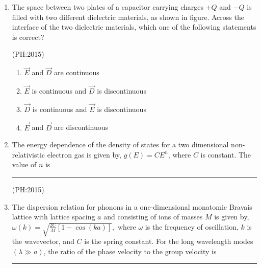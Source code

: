 \documentclass[journal,12pt,onecolumn]{IEEEtran}
\theoremstyle{remark}
\begin{document}
\begin{enumerate}
			\hfill{(PH:2015)}
		\begin{multicols}{4}
			\begin{enumerate}
				\item $n\approx p$
				\item $n > p$
				\item $\mu_e > \mu_h$
				\item ${m_e}^* > {m_h}^*$
			\end{enumerate}
		\end{multicols}
	\item
		The space between two plates of a capacitor carrying charges $+Q$ and $-Q$ is filled with two different dielectric materials, as shown in figure. Across the interface of the two dielectric materials, which one of the following statements is correct?
		\begin{center}
			
		\end{center}

		\hfill{(PH:2015)}
		\vspace{0.5cm}
	\begin{multicols}{2}
			\begin{enumerate}
				\item $\overrightarrow{E}$ and $\overrightarrow{D}$ are continuous
				\item $\overrightarrow{E}$ is continuous and $\overrightarrow{D}$ is discontinuous
				\item $\overrightarrow{D}$ is continuous and $\overrightarrow{E}$ is discontinuous
				\item $\overrightarrow{E}$ and $\overrightarrow{D}$ are discontinuous
			\end{enumerate}
		\end{multicols}
	\item 
		The energy dependence of the density of states for a two dimensional non-relativistic electron gas is given by, $g(E) = CE^n$, where $C$ is constant. The value of $n$ is \rule{2.5cm}{0.4pt}

		\hfill{(PH:2015)}
		\vspace{0.5cm}
	\item
		The dispersion relation for phonons in a one-dimensional monatomic Bravais lattice with lattice spacing $a$ and consisting of ions of masses $M$ is given by, $\omega(k) = \sqrt{\frac{2C}{M} \left[ 1 - \cos(ka) \right]},$ where $\omega$ is the frequency of oscillation, $k$ is the wavevector, and $C$ is the spring constant. For the long wavelength modes $(\lambda \gg a)$, the ratio of the phase velocity to the group velocity is \rule{2cm}{0.4pt}


\end{enumerate}
\end{document}
